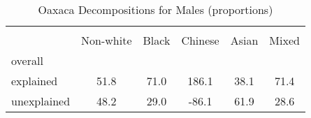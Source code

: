\begin{table}[htbp]\centering
\caption{Oaxaca Decompositions for Males (proportions)}
\begin{tabular}{l*{5}{c}}
\hline\hline
          &         &         &         &         &         \\
          &Non-white&    Black&  Chinese&    Asian&    Mixed\\
\hline
overall   &         &         &         &         &         \\
explained &     51.8&     71.0&    186.1&     38.1&     71.4\\
unexplained&     48.2&     29.0&    -86.1&     61.9&     28.6\\
\hline\hline
\end{tabular}
\label{tab:oaxaca_pct_male}
\end{table}
